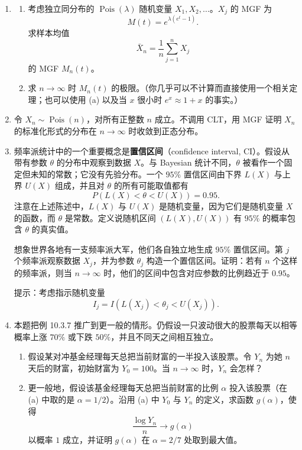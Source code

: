 \documentclass[UTF8,12pt,a4paper,fontset=fandol]{ctexart}
\begin{document}
\begin{enumerate}
  \item
  \begin{enumerate}
    \item 考虑独立同分布的 $\operatorname{Pois}(\lambda)$ 随机变量 $X_1,X_2,\ldots$。$X_j$ 的 MGF 为
    \[
      M(t)=e^{\lambda(e^t-1)}.
    \]
    求样本均值
    \[
      \bar X_n=\frac1n\sum_{j=1}^n X_j
    \]
    的 MGF $M_n(t)$。
    \item 求 $n\to\infty$ 时 $M_n(t)$ 的极限。（你几乎可以不计算而直接使用一个相关定理；也可以使用 (a) 以及当 $x$ 很小时 $e^x\approx 1+x$ 的事实。）
  \end{enumerate}

  \item 令 $X_n\sim\operatorname{Pois}(n)$，对所有正整数 $n$ 成立。不调用 CLT，用 MGF 证明 $X_n$ 的标准化形式的分布在 $n\to\infty$ 时收敛到正态分布。

  \item 频率派统计中的一个重要概念是\textbf{置信区间}（confidence interval, CI）。假设从带有参数 $\theta$ 的分布中观察到数据 $X$。与 Bayesian 统计不同，$\theta$ 被看作一个固定但未知的常数；它没有先验分布。一个 $95\%$ 置信区间由下界 $L(X)$ 与上界 $U(X)$ 组成，并且对 $\theta$ 的所有可能取值都有
  \[
    P(L(X)<\theta<U(X))=0.95.
  \]
  注意在上述陈述中，$L(X)$ 与 $U(X)$ 是随机变量，因为它们是随机变量 $X$ 的函数，而 $\theta$ 是常数。定义说随机区间 $(L(X),U(X))$ 有 $95\%$ 的概率包含 $\theta$ 的真实值。

  想象世界各地有一支频率派大军，他们各自独立地生成 $95\%$ 置信区间。第 $j$ 个频率派观察数据 $X_j$，并为参数 $\theta_j$ 构造一个置信区间。证明：若有 $n$ 个这样的频率派，则当 $n\to\infty$ 时，他们的区间中包含对应参数的比例趋近于 $0.95$。

  提示：考虑指示随机变量
  \[
    I_j=I(L(X_j)<\theta_j<U(X_j)).
  \]

  \item 本题把例 10.3.7 推广到更一般的情形。仍假设一只波动很大的股票每天以相等概率上涨 $70\%$ 或下跌 $50\%$，并且不同天之间相互独立。
  \begin{enumerate}
    \item 假设某对冲基金经理每天总把当前财富的一半投入该股票。令 $Y_n$ 为她 $n$ 天后的财富，初始财富为 $Y_0=100$。当 $n\to\infty$ 时，$Y_n$ 会怎样？
    \item 更一般地，假设该基金经理每天总把当前财富的比例 $\alpha$ 投入该股票（在 (a) 中取的是 $\alpha=1/2$）。沿用 (a) 中 $Y_0$ 与 $Y_n$ 的定义，求函数 $g(\alpha)$，使得
    \[
      \frac{\log Y_n}{n}\to g(\alpha)
    \]
    以概率 $1$ 成立，并证明 $g(\alpha)$ 在 $\alpha=2/7$ 处取到最大值。
  \end{enumerate}
\end{enumerate}
\end{document}
